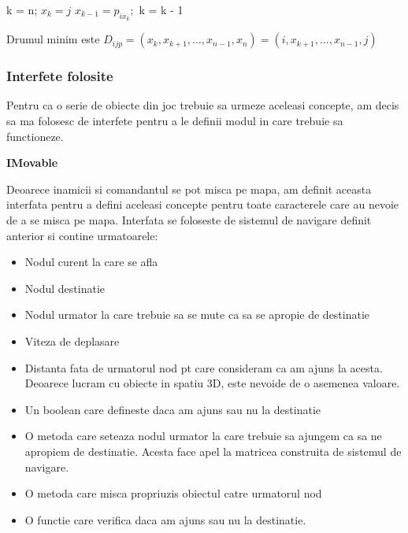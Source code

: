 \documentclass[12pt, a4paper]{article}
\begin{document}
	\begin{algorithmic}
			\State k = n;
			\State $x_k = j$
				\State $x_{k - 1} = p_{ix_k};$
				\State k = k - 1
			\EndWhile
		\EndFunction
	\end{algorithmic}

	Drumul minim este $D_{ijp} = (x_k, x_{k+1}, \dots, x_{n-1}, x_n) = (i, x_{k+1}, \dots, x_{n-1}, j)$
	
	
	
	
	
	\subsubsection{Interfete folosite}
	
	Pentru ca o serie de obiecte din joc trebuie sa urmeze aceleasi concepte, am decis sa ma folosesc de interfete pentru a le definii modul in care trebuie sa functioneze. 
	\newline
	
	\textbf{IMovable}
	
	Deoarece inamicii si comandantul se pot misca pe mapa, am definit aceasta interfata pentru a defini aceleasi concepte pentru toate caracterele care au nevoie de a se misca pe mapa. Interfata se foloseste de sistemul de navigare definit anterior si contine urmatoarele:
	
	\begin{itemize}
		\item Nodul curent la care se afla
		\item Nodul destinatie
		\item Nodul urmator la care trebuie sa se mute ca sa se apropie de destinatie
		\item Viteza de deplasare
		\item Distanta fata de urmatorul nod pt care consideram ca am ajuns la acesta. Deoarece lucram cu obiecte in spatiu 3D, este nevoide de o asemenea valoare.
		\item Un boolean care defineste daca am ajuns sau nu la destinatie
		\item O metoda care seteaza nodul urmator la care trebuie sa ajungem ca sa ne apropiem de destinatie. Acesta face apel la matricea construita de sistemul de navigare.
		\item O metoda care misca propriuzis obiectul catre urmatorul nod
		\item O functie care verifica daca am ajuns sau nu la destinatie.
	\end{itemize}
	\bigskip
\end{document}
